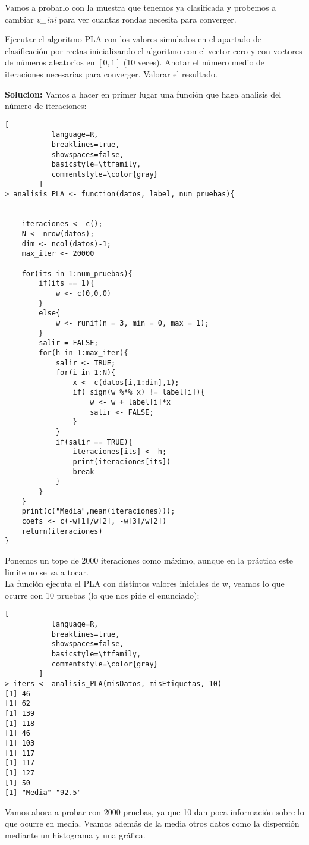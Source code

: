 \documentclass[11pt,fleqn]{book} %
\begin{document}
Vamos a probarlo con la muestra que tenemos ya clasificada y probemos a cambiar \textit{v\_ini} para ver
cuantas rondas necesita para converger.\\
\begin{exercise}
Ejecutar el algoritmo PLA con los valores simulados en el apartado de clasificación por rectas inicializando el algoritmo con el vector cero y con vectores de números aleatorios en $[0,1]$ (10 veces).
Anotar el número medio de iteraciones necesarias para converger. Valorar el resultado.
\end{exercise}
\textbf{Solucion:}
Vamos a hacer en primer lugar una función que haga analisis del número de iteraciones:
\lstset{escapeinside=¿}
\begin{lstlisting}[
           language=R,
           breaklines=true,
           showspaces=false,
           basicstyle=\ttfamily,
           commentstyle=\color{gray}
        ]
> analisis_PLA <- function(datos, label, num_pruebas){
    
   
    iteraciones <- c();
    N <- nrow(datos);
    dim <- ncol(datos)-1;
    max_iter <- 20000
    
    for(its in 1:num_pruebas){
        if(its == 1){
            w <- c(0,0,0)
        }
        else{
            w <- runif(n = 3, min = 0, max = 1);
        }
        salir = FALSE;
        for(h in 1:max_iter){
            salir <- TRUE;
            for(i in 1:N){
                x <- c(datos[i,1:dim],1);
                if( sign(w %*% x) != label[i]){
                    w <- w + label[i]*x
                    salir <- FALSE;
                }
            }
            if(salir == TRUE){
                iteraciones[its] <- h;
                print(iteraciones[its])
                break
            }
        }
    }
    print(c("Media",mean(iteraciones)));
    coefs <- c(-w[1]/w[2], -w[3]/w[2])
    return(iteraciones)
}
\end{lstlisting}
Ponemos un tope de 2000 iteraciones como máximo, aunque en la práctica este limite no se va a tocar.\\
La función ejecuta el PLA con distintos valores iniciales de w, veamos lo que ocurre con 10 pruebas (lo que nos pide el enunciado):
\begin{lstlisting}[
           language=R,
           breaklines=true,
           showspaces=false,
           basicstyle=\ttfamily,
           commentstyle=\color{gray}
        ]
> iters <- analisis_PLA(misDatos, misEtiquetas, 10)
[1] 46
[1] 62
[1] 139
[1] 118
[1] 46
[1] 103
[1] 117
[1] 117
[1] 127
[1] 50
[1] "Media" "92.5" 
\end{lstlisting}
Vamos ahora a probar con 2000 pruebas, ya que 10 dan poca información sobre lo que ocurre en media.
Veamos además de la media otros datos como la dispersión mediante un histograma y una gráfica.
\end{document}
